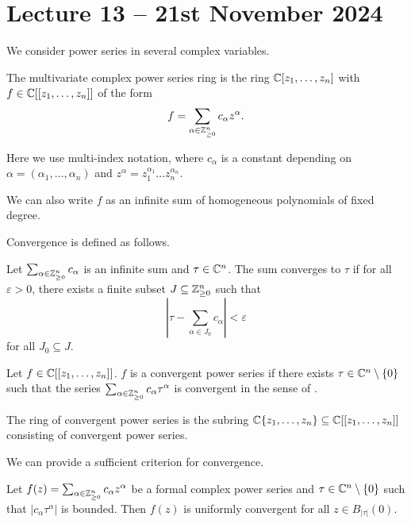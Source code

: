 \section{Lecture 13 -- 21st November 2024}\label{sec: lecture 13}
We consider power series in several complex variables. 
\begin{definition}\label{def: multivariate complex power series}
    The multivariate complex power series ring is the ring $\mathbb{C}[z_{1},\dots,z_{n}]$ with $f\in\mathbb{C}[[z_{1},\dots,z_{n}]]$ of the form 
    $$f=\sum_{\alpha\in\mathbb{Z}_{\geq0}^{n}}c_{\alpha}z^{\alpha}.$$
\end{definition}
\begin{remark}
    Here we use multi-index notation, where $c_{\alpha}$ is a constant depending on $\alpha=(\alpha_{1},\dots,\alpha_{n})$ and $z^{\alpha}=z_{1}^{\alpha_{1}}\dots z_{n}^{\alpha_{n}}$. 
\end{remark}
\begin{remark}
    We can also write $f$ as an infinite sum of homogeneous polynomials of fixed degree. 
\end{remark}
Convergence is defined as follows. 
\begin{definition}\label{def: convergence}
    Let $\sum_{\alpha\in\mathbb{Z}_{\geq0}^{n}}c_{\alpha}$ is an infinite sum and $\tau\in\mathbb{C}^{n}$. The sum converges to $\tau$ if for all $\varepsilon>0$, there exists a finite subset $J\subseteq\mathbb{Z}_{\geq0}^{n}$ such that
    $$\left|\tau-\sum_{\alpha\in J_{0}}c_{\alpha}\right|<\varepsilon$$
    for all $J_{0}\subseteq J$.
\end{definition}
\begin{definition}\label{def: formal power series convergence}
    Let $f\in\mathbb{C}[[z_{1},\dots,z_{n}]]$. $f$ is a convergent power series if there exists $\tau\in\mathbb{C}^{n}\setminus\{0\}$ such that the series $\sum_{\alpha\in\mathbb{Z}_{\geq0}^{n}}c_{\alpha}\tau^{\alpha}$ is convergent in the sense of .
\end{definition}
\begin{definition}\label{def: ring of formal power series}
    The ring of convergent power series is the subring $\mathbb{C}\{z_{1},\dots,z_{n}\}\subseteq\mathbb{C}[[z_{1},\dots,z_{n}]]$ consisting of convergent power series.
\end{definition}
We can provide a sufficient criterion for convergence. 
\begin{proposition}\label{prop: sufficient conditions for convergence}
    Let $f(z)=\sum_{\alpha\in\mathbb{Z}_{\geq0}^{n}}c_{\alpha}z^{\alpha}$ be a formal complex power series and $\tau\in\mathbb{C}^{n}\setminus\{0\}$ such that $|c_{\alpha}\tau^{\alpha}|$ is bounded. Then $f(z)$ is uniformly convergent for all $z\in B_{|\tau|}(0)$. 
\end{proposition}
